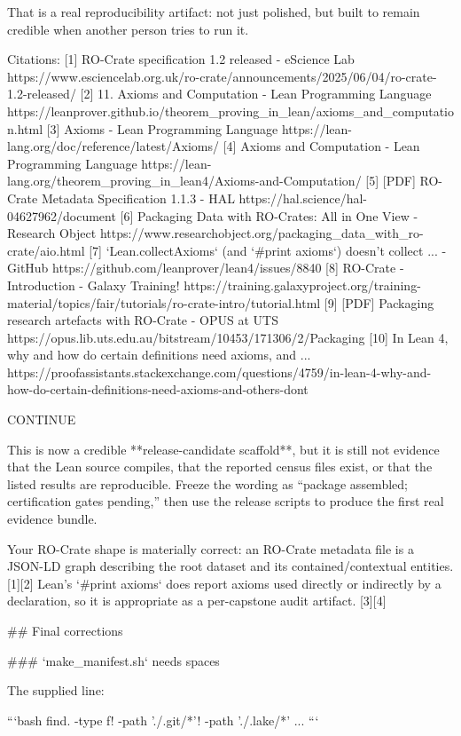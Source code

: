That is a real reproducibility artifact: not just polished, but built to remain credible when another person tries to run it.

Citations:
[1] RO-Crate specification 1.2 released - eScience Lab https://www.esciencelab.org.uk/ro-crate/announcements/2025/06/04/ro-crate-1.2-released/
[2] 11. Axioms and Computation - Lean Programming Language https://leanprover.github.io/theorem_proving_in_lean/axioms_and_computation.html
[3] Axioms - Lean Programming Language https://lean-lang.org/doc/reference/latest/Axioms/
[4] Axioms and Computation - Lean Programming Language https://lean-lang.org/theorem_proving_in_lean4/Axioms-and-Computation/
[5] [PDF] RO-Crate Metadata Specification 1.1.3 - HAL https://hal.science/hal-04627962/document
[6] Packaging Data with RO-Crates: All in One View - Research Object https://www.researchobject.org/packaging_data_with_ro-crate/aio.html
[7] `Lean.collectAxioms` (and `#print axioms`) doesn't collect ... - GitHub https://github.com/leanprover/lean4/issues/8840
[8] RO-Crate - Introduction - Galaxy Training! https://training.galaxyproject.org/training-material/topics/fair/tutorials/ro-crate-intro/tutorial.html
[9] [PDF] Packaging research artefacts with RO-Crate - OPUS at UTS https://opus.lib.uts.edu.au/bitstream/10453/171306/2/Packaging%
[10] In Lean 4, why and how do certain definitions need axioms, and ... https://proofassistants.stackexchange.com/questions/4759/in-lean-4-why-and-how-do-certain-definitions-need-axioms-and-others-dont

CONTINUE 🤔

This is now a credible **release-candidate scaffold**, but it is still not evidence that the Lean source compiles, that the reported census files exist, or that the listed results are reproducible. Freeze the wording as “package assembled; certification gates pending,” then use the release scripts to produce the first real evidence bundle.

Your RO-Crate shape is materially correct: an RO-Crate metadata file is a JSON-LD graph describing the root dataset and its contained/contextual entities. [1][2] Lean’s `#print axioms` does report axioms used directly or indirectly by a declaration, so it is appropriate as a per-capstone audit artifact. [3][4]

## Final corrections

### `make_manifest.sh` needs spaces

The supplied line:

```bash
find. -type f! -path './.git/*'! -path './.lake/*' ...
```

